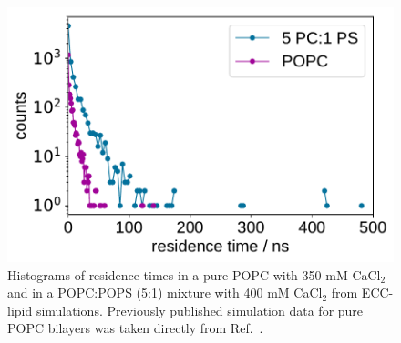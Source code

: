 \documentclass[journal=jctcce,manuscript=article]{achemso}
\newlength{\figwidth}
\begin{document}
\begin{figure}[!h]
  \centering
  \includegraphics[width=\figwidth]{../img/histogram_bound_times_26CaCl2_comparison_PC-PCPS.pdf}
  \caption{\label{fig:hist_residence_times}
    Histograms of   residence times in a pure POPC with 350 mM CaCl$_2$
    and in a POPC:POPS (5:1) mixture with 400 mM CaCl$_2$ from ECC-lipid simulations.
    Previously published simulation data \cite{melcr18} for pure POPC bilayers was taken directly from Ref.~.
  }
\end{figure}



 
 
\end{document}
